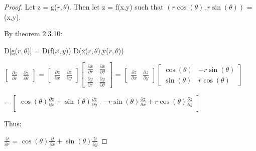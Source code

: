     \begin{proof}
        Let z = g($r,\theta$). Then let z = f(x,y)
        such that $(r\cos(\theta),r\sin(\theta))$ = (x,y).
        
        By {\color{red} theorem 2.3.10}:

        \hspace{0.2cm}
        D[g($r,\theta$)] = D(f($x,y$)) D(x($r,\theta$),y($r,\theta$))
        
        \hspace{0.2cm}
        $
        \begin{bmatrix}
            \frac{\partial z}{\partial r} & \frac{\partial z}{\partial \theta} 
        \end{bmatrix}
        $
        =
        $
        \begin{bmatrix}
            \frac{\partial z}{\partial x} & \frac{\partial z}{\partial y}
        \end{bmatrix}
        \begin{bmatrix}
            \frac{\partial x}{\partial r} & \frac{\partial x}{\partial \theta} \\
            \frac{\partial y}{\partial r} & \frac{\partial y}{\partial \theta}
        \end{bmatrix}
        $
        =
        $
        \begin{bmatrix}
            \frac{\partial z}{\partial x} & \frac{\partial z}{\partial y}
        \end{bmatrix}
        \begin{bmatrix}
            \scriptstyle \cos(\theta) & \scriptstyle -r\sin(\theta) \\
            \scriptstyle \sin(\theta) & \scriptstyle r\cos(\theta)
        \end{bmatrix}
        $

        \hspace{0.5cm}
        =
        $
        \begin{bmatrix}
            \scriptstyle \cos(\theta) \frac{\partial z}{\partial x}
                + \sin(\theta) \frac{\partial z}{\partial y} &
            \scriptstyle -r \sin(\theta) \frac{\partial z}{\partial x}
                + r \cos(\theta) \frac{\partial z}{\partial y} \\
        \end{bmatrix}
        $

        Thus:

        \hspace{0.5cm}
        $\frac{\partial}{\partial r}$
        = $\cos(\theta) \frac{\partial}{\partial x}
            + \sin(\theta) \frac{\partial}{\partial y}$


\end{proof}
